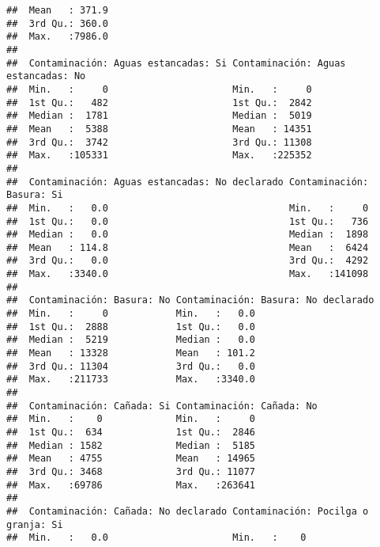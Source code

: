 \documentclass[11pt,]{article}
\begin{document}
\begin{verbatim}
##  Mean   : 371.9                                                      
##  3rd Qu.: 360.0                                                      
##  Max.   :7986.0                                                      
##                                                                      
##  Contaminación: Aguas estancadas: Si Contaminación: Aguas estancadas: No
##  Min.   :     0                      Min.   :     0                     
##  1st Qu.:   482                      1st Qu.:  2842                     
##  Median :  1781                      Median :  5019                     
##  Mean   :  5388                      Mean   : 14351                     
##  3rd Qu.:  3742                      3rd Qu.: 11308                     
##  Max.   :105331                      Max.   :225352                     
##                                                                         
##  Contaminación: Aguas estancadas: No declarado Contaminación: Basura: Si
##  Min.   :   0.0                                Min.   :     0           
##  1st Qu.:   0.0                                1st Qu.:   736           
##  Median :   0.0                                Median :  1898           
##  Mean   : 114.8                                Mean   :  6424           
##  3rd Qu.:   0.0                                3rd Qu.:  4292           
##  Max.   :3340.0                                Max.   :141098           
##                                                                         
##  Contaminación: Basura: No Contaminación: Basura: No declarado
##  Min.   :     0            Min.   :   0.0                     
##  1st Qu.:  2888            1st Qu.:   0.0                     
##  Median :  5219            Median :   0.0                     
##  Mean   : 13328            Mean   : 101.2                     
##  3rd Qu.: 11304            3rd Qu.:   0.0                     
##  Max.   :211733            Max.   :3340.0                     
##                                                               
##  Contaminación: Cañada: Si Contaminación: Cañada: No
##  Min.   :    0             Min.   :     0           
##  1st Qu.:  634             1st Qu.:  2846           
##  Median : 1582             Median :  5185           
##  Mean   : 4755             Mean   : 14965           
##  3rd Qu.: 3468             3rd Qu.: 11077           
##  Max.   :69786             Max.   :263641           
##                                                     
##  Contaminación: Cañada: No declarado Contaminación: Pocilga o granja: Si
##  Min.   :   0.0                      Min.   :    0                      

\end{verbatim}
\end{document}
